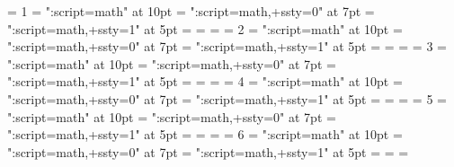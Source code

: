 \ifdefined\mathalphafontname
  \chardef\normalfam = 1 %
  \font   \tenalpha = "\mathalphafontname:script=math" at 10pt
  \font \sevenalpha = "\mathalphafontname:script=math,+ssty=0" at 7pt
  \font  \fivealpha = "\mathalphafontname:script=math,+ssty=1" at 5pt
  \textfont         \normalfam   =   \tenalpha
  \scriptfont       \normalfam   = \sevenalpha
  \scriptscriptfont \normalfam   =  \fivealpha
\else \let\normalfam=\unimathfam 
  \let\tenalpha=\tenmath
  \let\sevenalpha=\sevenmath
  \let\fivealpha=\fivemath
\fi
\ifdefined\mathdelimiterfontname
  \chardef\delimiterfam = 2
  \font   \tendelimiter = "\mathdelimiterfontname:script=math" at 10pt
  \font \sevendelimiter = "\mathdelimiterfontname:script=math,+ssty=0" at 7pt
  \font  \fivedelimiter = "\mathdelimiterfontname:script=math,+ssty=1" at 5pt
  \textfont         \delimiterfam   =   \tendelimiter
  \scriptfont       \delimiterfam   = \sevendelimiter
  \scriptscriptfont \delimiterfam   =  \fivedelimiter
\else \let\delimiterfam=\unimathfam \fi
\ifdefined\mathordfontname
  \chardef\ordfam = 3
  \font   \tenord = "\mathordfontname:script=math" at 10pt
  \font \sevenord = "\mathordfontname:script=math,+ssty=0" at 7pt
  \font  \fiveord = "\mathordfontname:script=math,+ssty=1" at 5pt
  \textfont         \ordfam   =   \tenord
  \scriptfont       \ordfam   = \sevenord
  \scriptscriptfont \ordfam   =  \fiveord
\else \let\ordfam=\unimathfam \fi
\ifdefined\mathopfontname
  \chardef\opfam = 4
  \font   \tenop = "\mathopfontname:script=math" at 10pt
  \font \sevenop = "\mathopfontname:script=math,+ssty=0" at 7pt
  \font  \fiveop = "\mathopfontname:script=math,+ssty=1" at 5pt
  \textfont         \opfam   =   \tenop
  \scriptfont       \opfam   = \sevenop
  \scriptscriptfont \opfam   =  \fiveop
\else \let\opfam=\unimathfam \fi
\ifdefined\mathbinfontname
  \chardef\binfam = 5
  \font   \tenbin = "\mathbinfontname:script=math" at 10pt
  \font \sevenbin = "\mathbinfontname:script=math,+ssty=0" at 7pt
  \font  \fivebin = "\mathbinfontname:script=math,+ssty=1" at 5pt
  \textfont         \binfam   =   \tenbin
  \scriptfont       \binfam   = \sevenbin
  \scriptscriptfont \binfam   =  \fivebin
\else \let\binfam=\unimathfam \fi
\ifdefined\mathaccentfontname
  \chardef\accentfam = 6
  \font   \tenaccent = "\mathaccentfontname:script=math" at 10pt
  \font \sevenaccent = "\mathaccentfontname:script=math,+ssty=0" at 7pt
  \font  \fiveaccent = "\mathaccentfontname:script=math,+ssty=1" at 5pt
  \textfont         \accentfam   =   \tenaccent
  \scriptfont       \accentfam   = \sevenaccent
  \scriptscriptfont \accentfam   =  \fiveaccent
\else \let\accentfam=\unimathfam \fi

